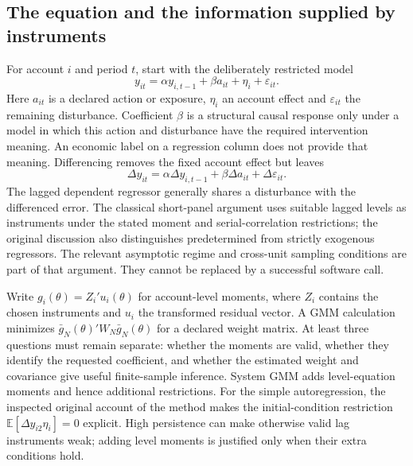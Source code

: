 \subsection{The equation and the information supplied by instruments}
For account $i$ and period $t$, start with the deliberately restricted model
\begin{equation}
 y_{it}=\alpha y_{i,t-1}+\beta a_{it}+\eta_i+\varepsilon_{it}.
\end{equation}
Here $a_{it}$ is a declared action or exposure, $\eta_i$ an account effect and
$\varepsilon_{it}$ the remaining disturbance. Coefficient $\beta$ is a structural
causal response only under a model in which this action and disturbance have the
required intervention meaning. An economic label on a regression column does not
provide that meaning. Differencing removes the fixed account effect but leaves
\begin{equation}
 \Delta y_{it}=\alpha\Delta y_{i,t-1}+\beta\Delta a_{it}+\Delta\varepsilon_{it}.
\end{equation}
The lagged dependent regressor generally shares a disturbance with the differenced
error. The classical short-panel argument uses suitable lagged levels as instruments
under the stated moment and serial-correlation restrictions; the original discussion
also distinguishes predetermined from strictly exogenous regressors.
The relevant asymptotic regime and cross-unit sampling conditions are part of that
argument. They cannot be replaced by a successful software call.
\citep{arellano1991}

Write $g_i(\theta)=Z_i'u_i(\theta)$ for account-level moments, where $Z_i$ contains
the chosen instruments and $u_i$ the transformed residual vector. A GMM calculation
minimizes $\bar g_N(\theta)'W_N\bar g_N(\theta)$ for a declared weight matrix.
At least three questions must remain separate: whether the moments are valid, whether
they identify the requested coefficient, and whether the estimated weight and covariance
give useful finite-sample inference. System GMM adds level-equation moments and hence
additional restrictions. For the simple autoregression, the inspected original account
of the method makes the initial-condition restriction
$\mathbb E[\Delta y_{i2}\eta_i]=0$ explicit. High persistence can make otherwise valid
lag instruments weak; adding level moments is justified only when their extra conditions
hold.~\citep{blundellbond2023}

